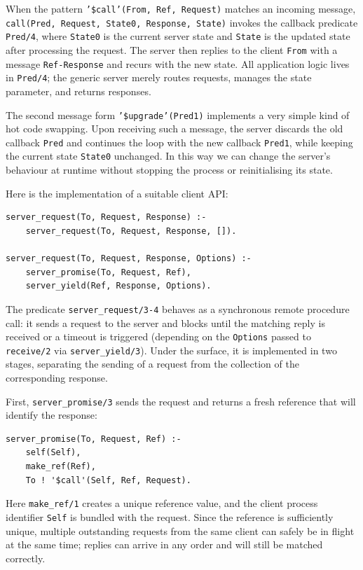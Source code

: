 \noindent When the pattern \texttt{'\$call'(From,\,Ref,\,Request)} matches an incoming message, \texttt{call(Pred,\,Request,\,State0,\,Response,\,State)} invokes the callback predicate \texttt{Pred/4}, where \texttt{State0} is the current server state and \texttt{State} is the updated state after processing the request. The server then replies to the client \texttt{From} with a message \texttt{Ref-Response} and recurs with the new state. All application logic lives in \texttt{Pred/4}; the generic server merely routes requests, manages the state parameter, and returns responses.

The second message form \texttt{'\$upgrade'(Pred1)} implements a very simple kind of hot code swapping. Upon receiving such a message, the server discards the old callback \texttt{Pred} and continues the loop with the new callback \texttt{Pred1}, while keeping the current state \texttt{State0} unchanged. In this way we can change the server's behaviour at runtime without stopping the process or reinitialising its state.

Here is the implementation of a suitable client API:

\begin{verbatim}
server_request(To, Request, Response) :-
    server_request(To, Request, Response, []).

server_request(To, Request, Response, Options) :-
    server_promise(To, Request, Ref),
    server_yield(Ref, Response, Options).
\end{verbatim}

\noindent The predicate \texttt{server\_request/3-4} behaves as a synchronous remote procedure call: it sends a request to the server and blocks until the matching reply is received or a timeout is triggered (depending on the \texttt{Options} passed to \texttt{receive/2} via \texttt{server\_yield/3}). Under the surface, it is implemented in two stages, separating the sending of a request from the collection of the corresponding response.

First, \texttt{server\_promise/3} sends the request and returns a fresh reference that will identify the response:

\begin{verbatim}
server_promise(To, Request, Ref) :-
    self(Self),
    make_ref(Ref),
    To ! '$call'(Self, Ref, Request).
\end{verbatim}

\noindent Here \texttt{make\_ref/1} creates a unique reference value, and the client process identifier \texttt{Self} is bundled with the request. Since the reference is sufficiently unique, multiple outstanding requests from the same client can safely be in flight at the same time; replies can arrive in any order and will still be matched correctly.

